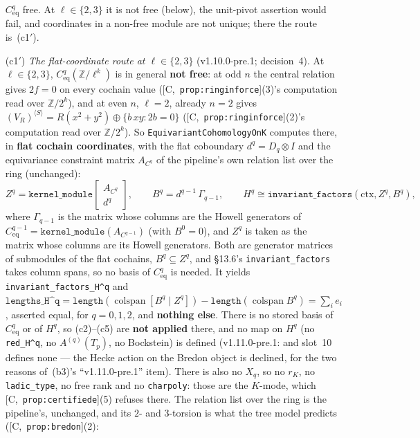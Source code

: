 \documentclass[11pt]{article}
\theoremstyle{remark}
\newcommand{\Z}{\mathbb{Z}}
\newcommand{\HA}[1]{[C,~\texttt{#1}]}      %
\begin{document}
\begin{enumerate}[label=(c\arabic*)]
  $C^q_{\mathrm{eq}}$ free. At $\ell\in\{2,3\}$ it is not free (below), the unit-pivot assertion
  would fail, and coordinates in a non-free module are not unique; there the route is~(c1$'$).
\item[(c1$'$)] \begingroup\sloppy\emph{The flat-coordinate route at $\ell\in\{2,3\}$} (v1.10.0-pre.1; decision~4).
  At $\ell\in\{2,3\}$, $C^q_{\mathrm{eq}}(\Z/\ell^k)$ is in general \textbf{not free}: at odd $n$
  the central relation gives $2f=0$ on every cochain value (\HA{prop:ringinforce}(3)'s
  computation read over $\Z/2^k$), and at even $n$, $\ell=2$, already $n=2$ gives
  $(V_R)^{\langle S\rangle}=R(x^2+y^2)\oplus\{b\,xy:2b=0\}$ (\HA{prop:ringinforce}(2)'s
  computation read over $\Z/2^k$). So \texttt{EquivariantCohomologyOnK} computes there, in
  \textbf{flat cochain coordinates}, with the flat coboundary $d^q=D_q\otimes I$ and the
  equivariance constraint matrix $A_{C^q}$ of the pipeline's own relation list over the ring
  (unchanged):
  \[
    Z^q=\texttt{kernel\_module}\!\begin{bmatrix}A_{C^q}\\ d^q\end{bmatrix},\qquad
    B^q=d^{q-1}\,\Gamma_{q-1},\qquad
    H^q\cong\texttt{invariant\_factors}(\mathrm{ctx},Z^q,B^q),
  \]
  where $\Gamma_{q-1}$ is the matrix whose columns are the Howell generators of
  $C^{q-1}_{\mathrm{eq}}=\texttt{kernel\_module}(A_{C^{q-1}})$ (with $B^0=0$), and $Z^q$ is taken
  as the matrix whose columns are its Howell generators. Both are generator matrices of submodules of
  the flat cochains, $B^q\subseteq Z^q$, and \S13.6's \texttt{invariant\_factors} takes column
  spans, so no basis of $C^q_{\mathrm{eq}}$ is needed. It yields
  \texttt{invariant\_factors\_H\textasciicircum q} and
  $\texttt{lengths\_H\textasciicircum q}=\texttt{length}(\operatorname{colspan}[B^q\mid Z^q])-
  \texttt{length}(\operatorname{colspan}B^q)=\sum_ie_i$, asserted equal, for $q=0,1,2$, and
  \textbf{nothing else}. There is no stored basis of $C^q_{\mathrm{eq}}$ or of $H^q$, so (c2)--(c5)
  are \textbf{not applied} there, and no map on $H^q$ (no \texttt{red\_H\textasciicircum q}, no
  $A^{(q)}(T_p)$, no Bockstein) is defined (v1.11.0-pre.1: and slot~10 defines none --- the Hecke action on the Bredon object is declined, for the two reasons of~(b3)'s ``v1.11.0-pre.1'' item). There is also no $X_q$, so no $r_K$, no
  \texttt{ladic\_type}, no free rank and no \texttt{charpoly}: those are the $K$-mode, which
  \HA{prop:certifiede}(5) refuses there. The relation list over the ring is the pipeline's,
  unchanged, and its $2$- and $3$-torsion is what the tree model predicts (\HA{prop:bredon}(2):

\end{enumerate}
\end{document}
